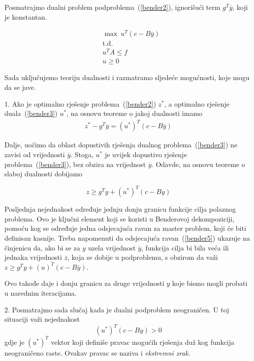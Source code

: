 \documentclass[a4paper, utf8, 11pt, colorlinks]{book}
\theoremstyle{definition}
\begin{document}
 
Posmatrajmo dualni problem podproblema~(\ref{bender2}), ignorišući term $g^T\overline{y}$, koji je konstantan.

\begin{equation}
	\begin{aligned}\label{bender3}
	&\max\ u^T (c-B\overline{y})\\
 		& \mbox{t.d.}\\
	&u^TA\leqslant f\\
	&u\geqslant 0
 \end{aligned}
\end{equation}


Sada uključujemo teoriju dualnosti i razmatramo sljedeće mogućnosti, koje mogu da se jave.
 
1. Ako je optimalno rješenje problema~(\ref{bender2}) $z^*$, a optimalno rješenje duala~(\ref{bender3}) $u^*$, na osnovu teoreme o jakoj  dualnosti imamo
  \begin{equation}
	\begin{aligned}\label{bender4}
z^*-g^T\overline{y}=(u^*)^T(c-B\overline{y})
	\end{aligned}
\end{equation}


Dalje, uočimo da oblast dopustivih rješenja dualnog problema~(\ref{bender3}) ne zavisi od vrijednosti $\overline{y}$. Stoga, $u^*$ je uvijek dopustivo rješenje problema~(\ref{bender3}), bez obzira na vrijednost $\overline{y}$. Odavde, na osnovu teoreme o slaboj  dualnosti dobijamo

  \begin{equation}
\label{bender5}
		z\geqslant g^Ty+(u^*)^T(c-By)
\end{equation}


Posljednja nejednakost određuje jednju donju granicu funkcije cilja polaznog problema. Ovo je ključni element koji se koristi u Benderovoj dekompoziciji, pomoću kog se određuje jedna odsjecajuća ravan za master problem, koji će biti definisan kasnije. Treba napomenuti da odsjecajuća ravan~(\ref{bender5}) ukazuje na činjenicu da, ako bi se za $y$ uzela vrijednost $\overline{y}$, funkcija cilja bi bila veća ili jednaka vrijednosti $\overline{z}$, koja se dobije u podproblemu, s obzirom da važi $	z\geqslant g^Ty+(u)^T(c-B\overline{y})$.

Ovo takođe daje i donju granicu za druge vrijednosti $y$ koje bismo mogli probati u narednim iteracijama.

2. Posmatrajmo sada slučaj kada je dualni podproblem neograničen. U toj situaciji važi nejednakost
\begin{equation}
	\label{bender6}
	(u^*)^T(c-By)>0
\end{equation}
gdje je ${(u^*)}^T$ vektor koji definiše pravac mogućih rješenja duž kog funkcija neograničeno raste. Ovakav pravac se naziva i \emph{ekstremni zrak}.
 
\end{document}

